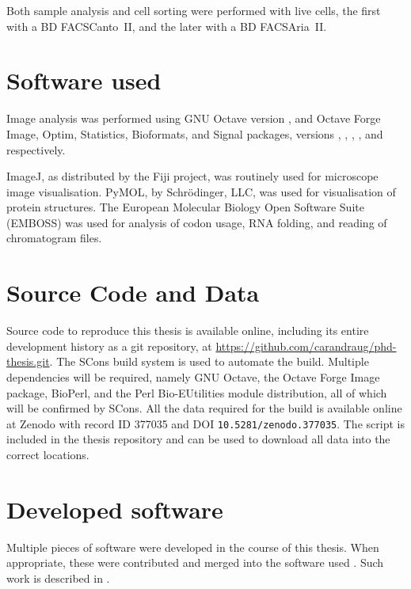       Both sample analysis and cell sorting were performed with live cells, the
      first with a BD FACSCanto~II, and the later with a BD FACSAria~II.

  \section{Software used}
    \label{sec:methods:software}
    Image analysis was performed using GNU Octave version \OctaveVersion{},
    and Octave Forge Image, Optim, Statistics, Bioformats, and Signal
    packages, versions \OctaveImageVersion{}, \OctaveOptimVersion{},
    \OctaveStatisticsVersion{}, \OctaveBioformatsVersion{}, and
    \OctaveSignalVersion{} respectively.

    ImageJ, as distributed by the Fiji project, was routinely used
    for microscope image visualisation.  PyMOL, by Schrödinger, LLC,
    was used for visualisation of protein structures.
    The European Molecular Biology Open Software Suite (EMBOSS)
    was used for analysis of codon usage, RNA folding, and reading of
    chromatogram files.

  \section{Source Code and Data}
    Source code to reproduce this thesis is available online,
    including its entire development history as a git repository, at
    \url{https://github.com/carandraug/phd-thesis.git}.  The SCons build
    system is used to automate the build.  Multiple dependencies will
    be required, namely GNU Octave, the Octave Forge Image package,
    BioPerl, and the Perl Bio-EUtilities module distribution, all of
    which will be confirmed by SCons.  All the data required for the
    build is available online at Zenodo with record ID 377035 and
    DOI \texttt{10.5281/zenodo.377035}.  The script
     is included in the thesis repository and
    can be used to download all data into the correct locations.

  \section{Developed software}
    Multiple pieces of software were developed in the course of this
    thesis.  When appropriate, these were contributed and merged into
    the software used .  Such work is
    described in .
